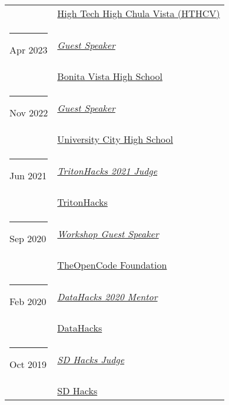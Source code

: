 \documentclass[margin,line]{res}
\begin{document}
\begin{resume}
\begin{longtable}{@{}p{0.7in}p{4in}}
\hspace*{-4mm} & \hspace{4mm} \href{https://www.hightechhigh.org/hthcv/}{High Tech High Chula Vista (HTHCV)}\\
\hspace*{-4mm} \rule{-1mm}{5mm} Apr 2023 & \href{https://bvh.sweetwaterschools.org/}{\textit{Guest Speaker}}\\*
\hspace*{-4mm} & \hspace{4mm} \href{https://bvh.sweetwaterschools.org/}{Bonita Vista High School}\\
\hspace*{-4mm} \rule{-1mm}{5mm} Nov 2022 & \href{https://uchs.sandiegounified.org/}{\textit{Guest Speaker}}\\*
\hspace*{-4mm} & \hspace{4mm} \href{https://uchs.sandiegounified.org/}{University City High School}\\
\hspace*{-4mm} \rule{-1mm}{5mm} Jun 2021 & \href{https://www.tritonhacks.org/}{\textit{TritonHacks 2021 Judge}}\\*
\hspace*{-4mm} & \hspace{4mm} \href{https://www.tritonhacks.org/}{TritonHacks}\\
\hspace*{-4mm} \rule{-1mm}{5mm} Sep 2020 & \href{https://www.theopencode.org/}{\textit{Workshop Guest Speaker}}\\*
\hspace*{-4mm} & \hspace{4mm} \href{https://www.theopencode.org/}{TheOpenCode Foundation}\\
\hspace*{-4mm} \rule{-1mm}{5mm} Feb 2020 & \href{http://datahacks.tech/}{\textit{DataHacks 2020 Mentor}}\\*
\hspace*{-4mm} & \hspace{4mm} \href{http://datahacks.tech/}{DataHacks}\\
\hspace*{-4mm} \rule{-1mm}{5mm} Oct 2019 & \href{https://www.sdhacks.io/}{\textit{SD Hacks Judge}}\\*
\hspace*{-4mm} & \hspace{4mm} \href{https://www.sdhacks.io/}{SD Hacks}\\

\end{longtable}
\end{resume}
\end{document}
